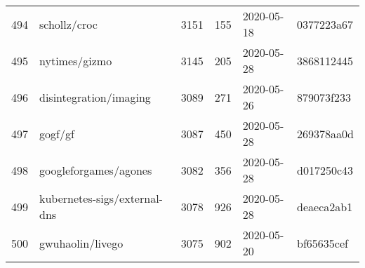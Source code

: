 \begin{longtable}{llrrll}
    494 &                                       schollz/croc &   3151 &    155 & 2020-05-18 &  0377223a67 \\
    495 &                                      nytimes/gizmo &   3145 &    205 & 2020-05-28 &  3868112445 \\
    496 &                             disintegration/imaging &   3089 &    271 & 2020-05-26 &  879073f233 \\
    497 &                                            gogf/gf &   3087 &    450 & 2020-05-28 &  269378aa0d \\
    498 &                              googleforgames/agones &   3082 &    356 & 2020-05-28 &  d017250c43 \\
    499 &                       kubernetes-sigs/external-dns &   3078 &    926 & 2020-05-28 &  deaeca2ab1 \\
    500 &                                   gwuhaolin/livego &   3075 &    902 & 2020-05-20 &  bf65635cef \\
\end{longtable}
